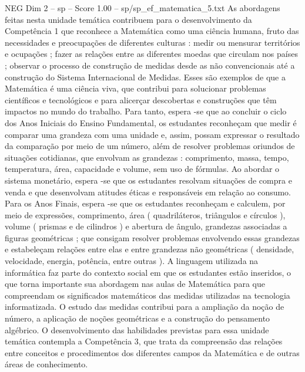 \begin{textsample}{NEG Dim 2 – sp – Score 1.00 – sp/sp\_ef\_matematica\_5.txt}
As abordagens feitas nesta unidade temática contribuem para o desenvolvimento da Competência 1 que reconhece a Matemática como uma ciência humana, fruto das necessidades e preocupações de diferentes culturas : medir ou mensurar territórios e ocupações ; fazer as relações entre as diferentes moedas que circulam nos países ; observar o processo de construção de medidas desde as não convencionais até a construção do Sistema Internacional de Medidas.
Esses são exemplos de que a Matemática é uma ciência viva, que contribui para solucionar problemas científicos e tecnológicos e para alicerçar descobertas e construções que têm impactos no mundo do trabalho.
Para tanto, espera -se que ao concluir o ciclo dos Anos Iniciais do Ensino Fundamental, os estudantes reconheçam que medir é comparar uma grandeza com uma unidade e, assim, possam expressar o resultado da comparação por meio de um número, além de resolver problemas oriundos de situações cotidianas, que envolvam as grandezas : comprimento, massa, tempo, temperatura, área, capacidade e volume, sem uso de fórmulas.
Ao abordar o sistema monetário, espera -se que os estudantes resolvam situações de compra e venda e que desenvolvam atitudes éticas e responsáveis em relação ao consumo.
Para os Anos Finais, espera -se que os estudantes reconheçam e calculem, por meio de expressões, comprimento, área ( quadriláteros, triângulos e círculos ), volume ( prismas e de cilindros ) e abertura de ângulo, grandezas associadas a figuras geométricas ; que consigam resolver problemas envolvendo essas grandezas e estabeleçam relações entre elas e entre grandezas não geométricas ( densidade, velocidade, energia, potência, entre outras ).
A linguagem utilizada na informática faz parte do contexto social em que os estudantes estão inseridos, o que torna importante sua abordagem nas aulas de Matemática para que compreendam os significados matemáticos das medidas utilizadas na tecnologia informatizada.
O estudo das medidas contribui para a ampliação da noção de número, a aplicação de noções geométricas e a construção do pensamento algébrico.
O desenvolvimento das habilidades previstas para essa unidade temática contempla a Competência 3, que trata da compreensão das relações entre conceitos e procedimentos dos diferentes campos da Matemática e de outras áreas de conhecimento.

\end{textsample}
